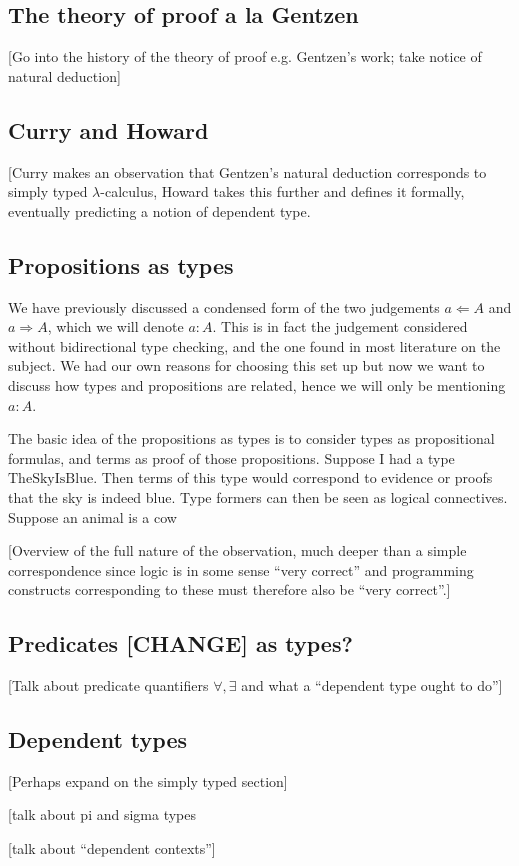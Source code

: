 \subsection{The theory of proof a la Gentzen}

[Go into the history of the theory of proof e.g. Gentzen's work; take notice of natural deduction]

\subsection{Curry and Howard}

[Curry makes an observation that Gentzen's natural deduction corresponds to simply typed $\lambda$-calculus, Howard takes this further and defines it formally, eventually predicting a notion of dependent type.

\subsection{Propositions as types}

We have previously discussed a condensed form of the two judgements $a \Leftarrow A$ and $a \Rightarrow A$, which we will denote $a : A$. This is in fact the judgement considered without bidirectional type checking, and the one found in most literature on the subject. We had our own reasons for choosing this set up but now we want to discuss how types and propositions are related, hence we will only be mentioning $a : A$.

The basic idea of the propositions as types is to consider types as propositional formulas, and terms as proof of those propositions. Suppose I had a type $\mathrm{TheSkyIsBlue}$. Then terms of this type would correspond to evidence or proofs that the sky is indeed blue. Type formers can then be seen as logical connectives. Suppose an animal is a cow


[Overview of the full nature of the observation, much deeper than a simple correspondence since logic is in some sense ``very correct'' and programming constructs corresponding to these must therefore also be ``very correct''.]

\subsection{Predicates [CHANGE] as types?}

[Talk about predicate quantifiers $\forall, \exists$ and what a ``dependent type ought to do'']

\subsection{Dependent types}


[Perhaps expand on the simply typed section]

[talk about pi and sigma types

[talk about ``dependent contexts'']


